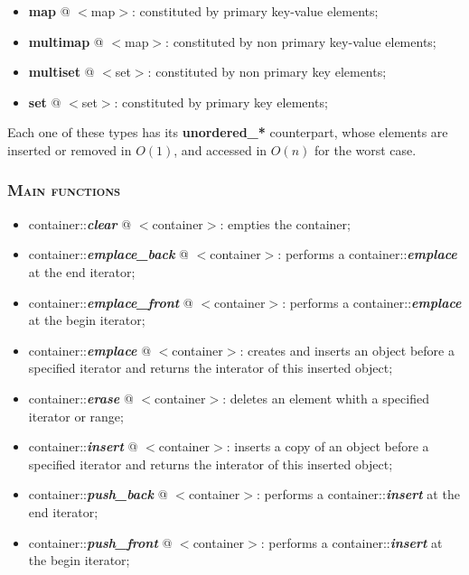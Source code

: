 \documentclass[10pt]{article}
\begin{document}
\begin{multicols*}{5}
{\begin{itemize}[leftmargin=*,topsep=0.25pt]
  \setlength\itemsep{-1.8pt}
	\item \textbf{map} @ $<$map$>$: constituted by primary key-value elements;
	\item \textbf{multimap} @ $<$map$>$: constituted by non primary key-value elements;  
	\item \textbf{multiset} @ $<$set$>$: constituted by non primary key elements;
	\item \textbf{set} @ $<$set$>$: constituted by primary key elements;
\end{itemize}
\noindent
Each one of these types has its \textbf{unordered\_*} counterpart, whose elements are inserted or removed in $O(1)$, and accessed in $O(n)$ for the worst case. 




\subsubsection*{\textsc{Main functions}} 
\noindent

\begin{itemize}[leftmargin=*,topsep=0.25pt]
  \setlength\itemsep{-1.8pt}
	\item container::\emph{\textbf{clear}} @ $<$container$>$: empties the container;
	\item container::\emph{\textbf{emplace\_back}} @ $<$container$>$: performs a container::\emph{\textbf{emplace}} at the end iterator;
	\item container::\emph{\textbf{emplace\_front}} @ $<$container$>$: performs a container::\emph{\textbf{emplace}} at the begin iterator;
	\item container::\emph{\textbf{emplace}} @ $<$container$>$: creates and inserts an object before a specified iterator and returns the interator of this inserted object;
	\item container::\emph{\textbf{erase}} @ $<$container$>$: deletes an element whith a specified iterator or range;
	\item container::\emph{\textbf{insert}} @ $<$container$>$: inserts a copy of an object before a specified iterator and returns the interator of this inserted object;
	\item container::\emph{\textbf{push\_back}} @ $<$container$>$: performs a container::\emph{\textbf{insert}} at the end iterator;
	\item container::\emph{\textbf{push\_front}} @ $<$container$>$: performs a container::\emph{\textbf{insert}} at the begin iterator;
\end{itemize}
\noindent


}
\end{multicols*}
\end{document}
